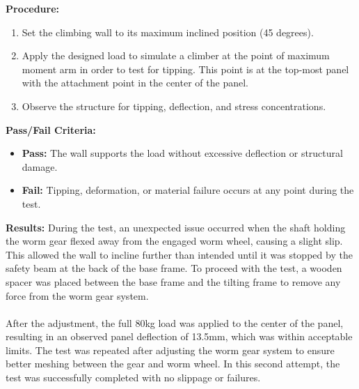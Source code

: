 \textbf{Procedure:}
\begin{enumerate}
    \item Set the climbing wall to its maximum inclined position (45 degrees).
    \item Apply the designed load to simulate a climber at the point of maximum moment arm in order to test for tipping. This point is at the top-most panel with the attachment point in the center of the panel.
    \item Observe the structure for tipping, deflection, and stress concentrations.
\end{enumerate}

\textbf{Pass/Fail Criteria:}
\begin{itemize}
    \item \textbf{Pass:} The wall supports the load without excessive deflection or structural damage.
    \item \textbf{Fail:} Tipping, deformation, or material failure occurs at any point during the test.
\end{itemize}
\noindent
\textbf{Results:}
During the test, an unexpected issue occurred when the shaft holding the worm gear flexed away from the engaged worm wheel, causing a slight slip. This allowed the wall to incline further than intended until it was stopped by the safety beam at the back of the base frame. To proceed with the test, a wooden spacer was placed between the base frame and the tilting frame to remove any force from the worm gear system.\\\\
After the adjustment, the full 80kg load was applied to the center of the panel, resulting in an observed panel deflection of 13.5mm, which was within acceptable limits. The test was repeated after adjusting the worm gear system to ensure better meshing between the gear and worm wheel. In this second attempt, the test was successfully completed with no slippage or failures.


